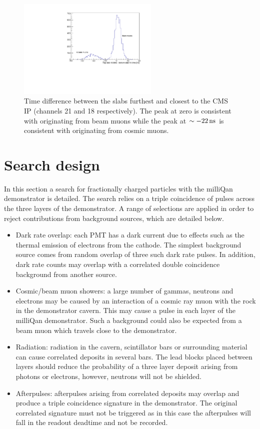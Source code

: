 \documentclass[12pt]{article}
\newcommand{\unit}[1]{\ensuremath{\text{\,#1}}\xspace}
\begin{document}
\begin{figure}[ht!]
    \centering
    \includegraphics[width=0.6\textwidth]{figures/timeDiffSlabs}
    \caption{\label{fig:timeDiff} Time difference between the slabs furthest and closest to the CMS IP (channels 21 and 18 respectively).
    The peak at zero is consistent with originating from beam muons while the peak at $\sim -22\unit{ns}$ is consistent with originating from 
    cosmic muons.}
\end{figure}

\section{Search design}
\label{sec:search}

In this section a search for fractionally charged particles with the milliQan demonstrator is
detailed. The search relies on a triple coincidence of pulses across the three layers of the demonstrator. 
A range of selections are applied in order to reject contributions from
background sources, which are detailed below.

\begin{itemize}
    \item Dark rate overlap: each PMT has a dark current due to effects such as the thermal emission of electrons from the cathode. The simplest background source comes from random overlap of three such dark rate pulses. In addition, dark rate counts may overlap with a correlated double coincidence background from another source.
    \item Cosmic/beam muon showers: a large number of gammas, neutrons and electrons may be caused by an interaction of a cosmic ray muon with the rock in the demonstrator cavern. This may cause a pulse in each layer of the milliQan demonstrator. Such a background could also be expected from a beam muon which travels close to the demonstrator.
    \item Radiation: radiation in the cavern, scintillator bars or surrounding material can cause correlated deposits in several bars. The lead blocks placed between layers should reduce the probability of a three layer deposit arising from photons or electrons, however, neutrons will not be shielded. 
    \item Afterpulses: afterpulses arising from correlated deposits may overlap and produce a triple coincidence signature in the demonstrator. The original correlated signature must not be triggered as in this case the afterpulses will fall in the readout deadtime and not be recorded.
\end{itemize}
\end{document}
